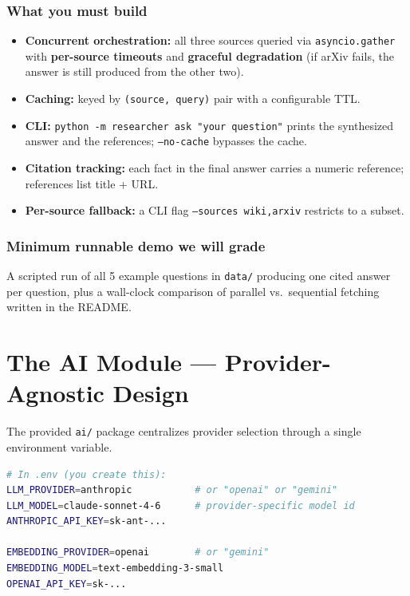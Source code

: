 \documentclass[11pt,a4paper]{article}
\begin{document}
\subsubsection{What you must build}
\begin{itemize}[topsep=2pt,itemsep=1pt]
  \item \textbf{Concurrent orchestration:} all three sources queried via \texttt{asyncio.gather} with \textbf{per-source timeouts} and \textbf{graceful degradation} (if arXiv fails, the answer is still produced from the other two).
  \item \textbf{Caching:} keyed by \texttt{(source, query)} pair with a configurable TTL.
  \item \textbf{CLI:} \texttt{python -m researcher ask "your question"} prints the synthesized answer and the references; \texttt{--no-cache} bypasses the cache.
  \item \textbf{Citation tracking:} each fact in the final answer carries a numeric reference; references list title + URL.
  \item \textbf{Per-source fallback:} a CLI flag \texttt{--sources wiki,arxiv} restricts to a subset.
\end{itemize}

\subsubsection{Minimum runnable demo we will grade}
A scripted run of all 5 example questions in \texttt{data/} producing one cited answer per question, plus a wall-clock comparison of parallel vs.\ sequential fetching written in the README.

\section{The AI Module --- Provider-Agnostic Design}\label{sec:ai-module}
The provided \texttt{ai/} package centralizes provider selection through a single environment variable.

\begin{lstlisting}[style=python,language=bash,numbers=none]
# In .env (you create this):
LLM_PROVIDER=anthropic           # or "openai" or "gemini"
LLM_MODEL=claude-sonnet-4-6      # provider-specific model id
ANTHROPIC_API_KEY=sk-ant-...

EMBEDDING_PROVIDER=openai        # or "gemini"
EMBEDDING_MODEL=text-embedding-3-small
OPENAI_API_KEY=sk-...
\end{lstlisting}
\end{document}

